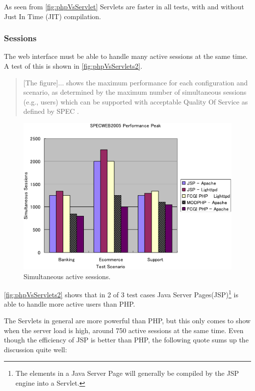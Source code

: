 As seen from \autoref{fig:phpVsServlet} Servlets are faster in all tests, with and without Just In Time (JIT) compilation.

\subsubsection*{Sessions}
The web interface must be able to handle many active sessions at the same time. A test of this is shown in \autoref{fig:phpVsServlets2}\cite[p. 173]{servletVsPHP}.

\begin{quotation}
[The figure]... shows the maximum performance for each configuration and scenario, as
determined by the maximum number of simultaneous sessions (e.g., users) which can
be supported with acceptable Quality Of Service as defined by SPEC \cite[p. 173]{servletVsPHP}.
\end{quotation}

\begin{figure}[htbp]
	\centering
		\includegraphics[width=1.00\textwidth]{images/phpVsServlets2.png}
	\caption{Simultaneous active sessions.}
	\label{fig:phpVsServlets2}
\end{figure}

\autoref{fig:phpVsServlets2} shows that in 2 of 3 test cases Java Server Pages(JSP)\footnote{The elements in a Java Server Page will generally be compiled by the JSP engine into a Servlet\cite{devx}.} is able to handle more active users than PHP.

The Servlets in general are more powerful than PHP, but this only comes to show when the server load is high, around 750 active sessions at the same time. Even though the efficiency of JSP is better than PHP, the following quote sums up the discussion quite well:

